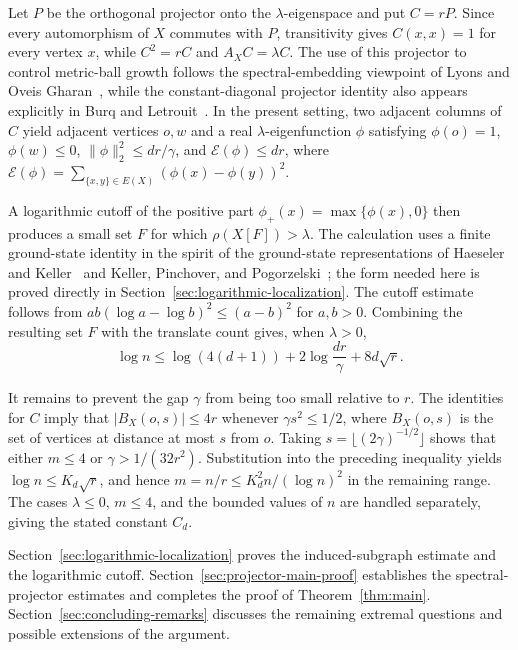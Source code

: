 \documentclass[11pt]{article}
\theoremstyle{definition}
\theoremstyle{remark}
\begin{document}
Let $P$ be the orthogonal projector onto the $\lambda$-eigenspace and put $C=rP$. Since every automorphism of $X$ commutes with $P$, transitivity gives $C(x,x)=1$ for every vertex $x$, while $C^2=rC$ and $A_XC=\lambda C$. The use of this projector to control metric-ball growth follows the spectral-embedding viewpoint of Lyons and Oveis Gharan~\cite[Section~6]{LyonsOveisGharan2018SpectralEmbedding}, while the constant-diagonal projector identity also appears explicitly in Burq and Letrouit~\cite[Equation~(3.2)]{BurqLetrouit2026Delocalized}. In the present setting, two adjacent columns of $C$ yield adjacent vertices $o,w$ and a real $\lambda$-eigenfunction $\phi$ satisfying $\phi(o)=1$, $\phi(w)\leq0$, $\|\phi\|_2^2\leq dr/\gamma$, and $\mathcal E(\phi)\leq dr$, where $\mathcal E(\phi)=\sum_{\{x,y\}\in E(X)}(\phi(x)-\phi(y))^2$.

A logarithmic cutoff of the positive part $\phi_+(x)=\max\{\phi(x),0\}$ then produces a small set $F$ for which $\rho(X[F])>\lambda$. The calculation uses a finite ground-state identity in the spirit of the ground-state representations of Haeseler and Keller~\cite[Proposition~3.2]{HaeselerKeller2011Generalized} and Keller, Pinchover, and Pogorzelski~\cite[Proposition~4.8]{KellerPinchoverPogorzelski2020Criticality}; the form needed here is proved directly in Section~\ref{sec:logarithmic-localization}. The cutoff estimate follows from $ab(\log a-\log b)^2\leq(a-b)^2$ for $a,b>0$. Combining the resulting set $F$ with the translate count gives, when $\lambda>0$,
\[
\log n\leq\log(4(d+1))+2\log\frac{dr}{\gamma}+8d\sqrt r.
\]

It remains to prevent the gap $\gamma$ from being too small relative to $r$. The identities for $C$ imply that $|B_X(o,s)|\leq4r$ whenever $\gamma s^2\leq1/2$, where $B_X(o,s)$ is the set of vertices at distance at most $s$ from $o$. Taking $s=\lfloor(2\gamma)^{-1/2}\rfloor$ shows that either $m\leq4$ or $\gamma>1/(32r^2)$. Substitution into the preceding inequality yields $\log n\leq K_d\sqrt r$, and hence $m=n/r\leq K_d^2n/(\log n)^2$ in the remaining range. The cases $\lambda\leq0$, $m\leq4$, and the bounded values of $n$ are handled separately, giving the stated constant $C_d$.

Section~\ref{sec:logarithmic-localization} proves the induced-subgraph estimate and the logarithmic cutoff. Section~\ref{sec:projector-main-proof} establishes the spectral-projector estimates and completes the proof of Theorem~\ref{thm:main}. Section~\ref{sec:concluding-remarks} discusses the remaining extremal questions and possible extensions of the argument.
\end{document}
